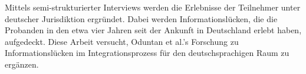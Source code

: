 





Mittels semi-strukturierter Interviews werden die Erlebnisse der Teilnehmer unter deutscher Jurisdiktion ergr\"undet. Dabei werden Informationsl\"ucken, die die Probanden in den etwa vier Jahren seit der Ankunft in Deutschland erlebt haben, aufgedeckt.\newline
Diese Arbeit versucht, Oduntan et al.'s Forschung zu Informationslücken im Integrationsprozess für den deutschsprachigen Raum zu ergänzen.\newline


